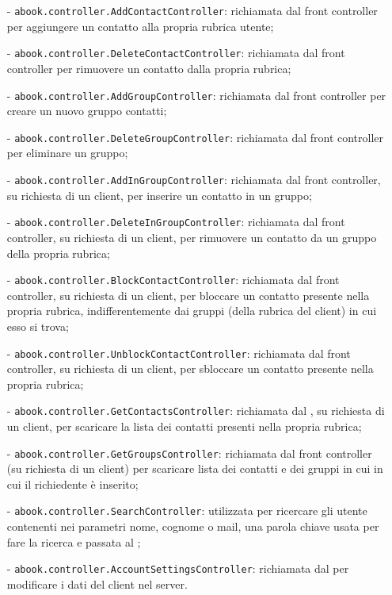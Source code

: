 \begin{description}
\begin{itemize}
	  \item[-] \texttt{abook.controller.AddContactController}: richiamata dal front controller per aggiungere un contatto alla propria rubrica utente;
	  \item[-] \texttt{abook.controller.DeleteContactController}: richiamata dal front controller per rimuovere un contatto dalla propria rubrica;
	  \item[-] \texttt{abook.controller.AddGroupController}: richiamata dal front controller per creare un nuovo gruppo contatti;
	  \item[-] \texttt{abook.controller.DeleteGroupController}: richiamata dal front controller per eliminare un gruppo;
	  \item[-] \texttt{abook.controller.AddInGroupController}: richiamata dal front controller, su richiesta di un client, per inserire un contatto in un gruppo;
	  \item[-] \texttt{abook.controller.DeleteInGroupController}: richiamata dal front controller, su richiesta di un client, per rimuovere un contatto da un gruppo della propria rubrica;
	  \item[-] \texttt{abook.controller.BlockContactController}: richiamata dal front controller, su richiesta di un client, per bloccare un contatto presente nella propria rubrica, indifferentemente dai gruppi (della rubrica del client) in cui esso si trova;
	  \item[-] \texttt{abook.controller.UnblockContactController}: richiamata dal front controller, su richiesta di un client, per sbloccare un contatto presente nella propria rubrica;
	  \item[-] \texttt{abook.controller.GetContactsController}: richiamata dal , su richiesta di un client, per scaricare la lista dei contatti presenti nella propria rubrica;
	  \item[-] \texttt{abook.controller.GetGroupsController}: richiamata dal front controller (su richiesta di un client) per scaricare lista dei contatti e dei gruppi in cui in cui il richiedente è inserito;
	  \item[-] \texttt{abook.controller.SearchController}: utilizzata per ricercare gli utente contenenti nei parametri nome, cognome o mail, una parola chiave usata per fare la ricerca e passata al ;
	  \item[-] \texttt{abook.controller.AccountSettingsController}: richiamata dal  per modificare i dati del client nel server.
\end{itemize}


\end{description}
